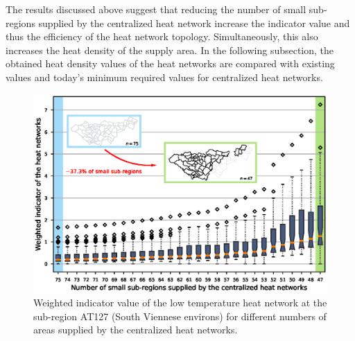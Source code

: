 The results discussed above suggest that reducing the number of small sub-regions supplied by the centralized heat network increase the indicator value and thus the efficiency of the heat network topology. Simultaneously, this also increases the heat density of the supply area. In the following subsection, the obtained heat density values of the heat networks are compared with existing values and today's minimum required values for centralized heat networks.

\begin{figure}
	\centering
	\includegraphics[width=1\linewidth]{figures/4_Results/boxplot.eps}
	\caption{Weighted indicator value of the low temperature heat network at the sub-region AT127 (South Viennese environs) for different numbers of areas supplied by the centralized heat networks.}
	\label{fig:res3}
\end{figure}
\newpage
